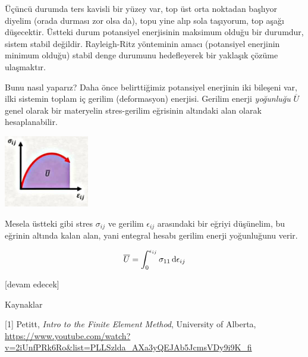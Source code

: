 \documentclass[12pt,fleqn]{article}\usepackage{../../common}
\begin{document}
Üçüncü durumda ters kavisli bir yüzey var, top üst orta noktadan başlıyor
diyelim (orada durması zor olsa da), topu yine alıp sola taşıyorum, top aşağı
düşecektir. Üstteki durum potansiyel enerjisinin maksimum olduğu bir durumdur,
sistem stabil değildir. Rayleigh-Ritz yönteminin amacı (potansiyel enerjinin
minimum olduğu) stabil denge durumunu hedefleyerek bir yaklaşık çözüme
ulaşmaktır.

Bunu nasıl yaparız? Daha önce belirttiğimiz potansiyel enerjinin iki bileşeni
var, ilki sistemin toplam iç gerilim (deformasyon) enerjisi. Gerilim enerji
{\em yoğunluğu} $\overline{U}$ genel olarak bir materyelin stres-gerilim eğrisinin
altındaki alan olarak hesaplanabilir.

\includegraphics[width=10em]{phy_020_strs_04_04.jpg}

Mesela üstteki gibi stres $\sigma_{ij}$ ve gerilim $\epsilon_{ij}$ arasındaki
bir eğriyi düşünelim, bu eğrinin altında kalan alan, yani entegral hesabı 
gerilim enerji yoğunluğunu verir.

$$
\overline{U} = \int_{0}^{\epsilon_{ij}} \sigma_{11} \,\mathrm{d} \epsilon_{ij}
$$















[devam edecek]

Kaynaklar

[1] Petitt, {\em Intro to the Finite Element Method}, University of Alberta,
    \url{https://www.youtube.com/watch?v=2iUnfPRk6Ro&list=PLLSzlda_AXa3yQEJAb5JcmsVDy9i9K_fi}
\end{document}
